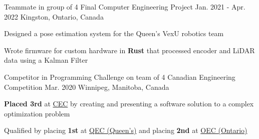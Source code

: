 
\begin{cventries}

  \cventry
    {Teammate in group of 4} %
    {Final Computer Engineering Project} %
    {Jan. 2021 - Apr. 2022} %
    {Kingston, Ontario, Canada} %
    {
      \begin{cvitems} %
        \item{Designed a pose estimation system for the Queen's VexU robotics team}
        \item{Wrote firmware for custom hardware in \textbf{Rust} that processed encoder and LiDAR data using a Kalman Filter%
        }
      \end{cvitems}
    }

  \cventry
    {Competitor in Programming Challenge on team of 4} %
    {Canadian Engineering Competition} %
    {Mar. 2020} %
    {Winnipeg, Manitoba, Canada} %
    {
      \begin{cvitems} %
        \item{\textbf{Placed 3rd} at \href{https://cfes.ca/cec/}{CEC} by creating and presenting a software solution to a complex optimization problem}
        \item{Qualified by placing \textbf{1st} at \href{https://quengcomp.ca/}{QEC (Queen's)} and placing \textbf{2nd} at \href{https://www.oec2020.ca/}{OEC (Ontario)}}
      \end{cvitems}
    }


\end{cventries}
